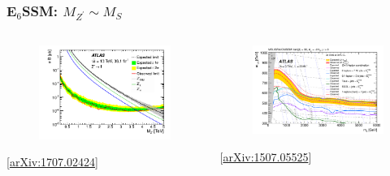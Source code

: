 \documentclass[10pt,aspectratio=169]{beamer}
\begin{document}
\begin{frame}
  \frametitle{E$_6$SSM: $M_{Z^\prime} \sim M_S$}
  \begin{columns}[t]
    \begin{column}{0.5\textwidth}
      \vspace{-20pt}
      \begin{figure}
        \hspace*{-15pt}
        \includegraphics[width=7.5cm]{atlas_z_prime}
      \end{figure}
    \vspace{-22pt}
    \begin{center}
      \tiny [\href{http://arxiv.org/abs/1707.02424}{arXiv:1707.02424}]
    \end{center}
    \end{column}
    \begin{column}{0.5\textwidth}
      \vspace{-20pt}
      \begin{figure}
        \hspace*{-15pt}
        \includegraphics[width=7.5cm]{atlas_cmssm}
      \end{figure}
      \vspace{-11pt}
      \begin{center}
        \tiny [\href{http://arxiv.org/abs/1507.05525}{arXiv:1507.05525}]
      \end{center}
    \end{column}
  \end{columns}
\end{frame}
\end{document}
